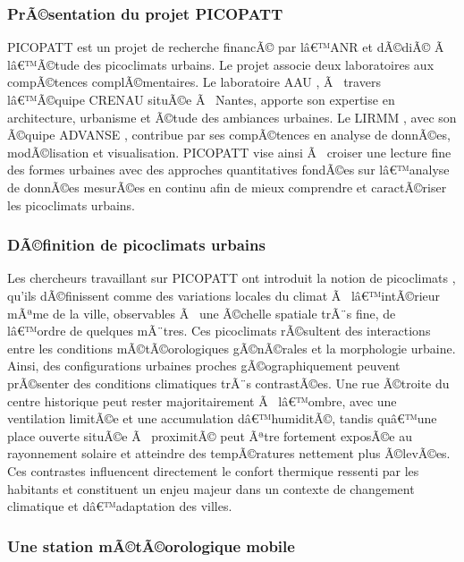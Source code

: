 \documentclass{article}
\begin{document}
\subsubsection{PrÃ©sentation du projet PICOPATT}

PICOPATT \cite{picopatt-site} est un projet de recherche financÃ© par lâ€™ANR et dÃ©diÃ© Ã  lâ€™Ã©tude des picoclimats urbains. Le projet associe deux laboratoires aux compÃ©tences complÃ©mentaires. Le laboratoire AAU \cite{aau-site}, Ã  travers lâ€™Ã©quipe CRENAU \cite{crenau-site} situÃ©e Ã  Nantes, apporte son expertise en architecture, urbanisme et Ã©tude des ambiances urbaines. Le LIRMM \cite{lirmm-site}, avec son Ã©quipe ADVANSE \cite{advanse-site}, contribue par ses compÃ©tences en analyse de donnÃ©es, modÃ©lisation et visualisation. PICOPATT vise ainsi Ã  croiser une lecture fine des formes urbaines avec des approches quantitatives fondÃ©es sur lâ€™analyse de donnÃ©es mesurÃ©es en continu afin de mieux comprendre et caractÃ©riser les picoclimats urbains.

\subsubsection{DÃ©finition de picoclimats urbains}

Les chercheurs travaillant sur PICOPATT ont introduit la notion de picoclimats \cite{picopatt-picoclimat}, qu'ils dÃ©finissent comme des variations locales du climat Ã  lâ€™intÃ©rieur mÃªme de la ville, observables Ã  une Ã©chelle spatiale trÃ¨s fine, de lâ€™ordre de quelques mÃ¨tres. Ces picoclimats rÃ©sultent des interactions entre les conditions mÃ©tÃ©orologiques gÃ©nÃ©rales et la morphologie urbaine. Ainsi, des configurations urbaines proches gÃ©ographiquement peuvent prÃ©senter des conditions climatiques trÃ¨s contrastÃ©es. Une rue Ã©troite du centre historique peut rester majoritairement Ã  lâ€™ombre, avec une ventilation limitÃ©e et une accumulation dâ€™humiditÃ©, tandis quâ€™une place ouverte situÃ©e Ã  proximitÃ© peut Ãªtre fortement exposÃ©e au rayonnement solaire et atteindre des tempÃ©ratures nettement plus Ã©levÃ©es. Ces contrastes influencent directement le confort thermique ressenti par les habitants et constituent un enjeu majeur dans un contexte de changement climatique et dâ€™adaptation des villes.

\newpage

\subsubsection{Une station mÃ©tÃ©orologique mobile}
\label{sec:intro_parcours}
\end{document}
